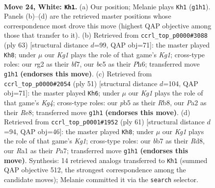 \documentclass[11pt]{article}
\begin{document}
\clearpage

\begin{figure}[p]\centering
\begin{subfigure}{0.46\textwidth}\centering
\resizebox{\linewidth}{!}{%
\newchessgame
\chessboard[
  setfen={1n2k3/1b6/8/ppb2p2/8/8/PN2PPr1/R2Q1RK1 w - - 0 24},
  showmover=false,
  pgfstyle=straightmove, color=movearrow, markmove={g1-h1}
]}
\caption{}
\end{subfigure}\hfill
\begin{subfigure}{0.46\textwidth}\centering
\resizebox{\linewidth}{!}{%
\newchessgame
\chessboard[
  setfen={1r1r2k1/5Bp1/3q3p/p7/8/7P/Q4PP1/2bR2K1 b - - 0 32},
  showmover=false,
  pgfstyle=straightmove, color=movearrow, markmove={g8-h8}
]}
\caption{}
\end{subfigure}
\\[4pt]
\begin{subfigure}{0.46\textwidth}\centering
\resizebox{\linewidth}{!}{%
\newchessgame
\chessboard[
  setfen={1r2r3/3B3p/p2p2p1/6k1/1R2n2P/5R2/P1P3P1/6K1 b - - 0 26},
  showmover=false,
  pgfstyle=straightmove, color=movearrow, markmove={g5-h6}
]}
\caption{}
\end{subfigure}\hfill
\begin{subfigure}{0.46\textwidth}\centering
\resizebox{\linewidth}{!}{%
\newchessgame
\chessboard[
  setfen={3r1rk1/p7/2p3Q1/4P3/1p3pp1/8/PPK1B1q1/R7 b - - 2 31},
  showmover=false,
  pgfstyle=straightmove, color=movearrow, markmove={g8-h8}
]}
\caption{}
\end{subfigure}
\caption{\textbf{Move 24, White: \texttt{Kh1}.} (a) Our position; Melanie plays \texttt{Kh1} (\texttt{g1h1}). Panels (b)--(d) are the retrieved master positions whose correspondence most drove this move (highest QAP objective among those that transfer to it). (b) Retrieved from \texttt{ccrl\_top\_p0000\#3088} (ply 63) [structural distance $d$=99, QAP obj=71]: the master played \texttt{Kh8}; under $\mu$ our \emph{Kg1} plays the role of that game's \emph{Kg1}; cross-type roles: our \emph{r}g2 as their \emph{b}f7, our \emph{b}c5 as their \emph{P}h6; transferred move \texttt{g1h1} \textbf{(endorses this move)}. (c) Retrieved from \texttt{ccrl\_top\_p0000\#2054} (ply 51) [structural distance $d$=104, QAP obj=71]: the master played \texttt{Kh6}; under $\mu$ our \emph{Kg1} plays the role of that game's \emph{Kg4}; cross-type roles: our \emph{p}b5 as their \emph{R}b8, our \emph{P}a2 as their \emph{R}e8; transferred move \texttt{g1h1} \textbf{(endorses this move)}. (d) Retrieved from \texttt{ccrl\_top\_p0001\#1952} (ply 61) [structural distance $d$=94, QAP obj=46]: the master played \texttt{Kh8}; under $\mu$ our \emph{Kg1} plays the role of that game's \emph{Kg1}; cross-type roles: our \emph{b}b7 as their \emph{R}d8, our \emph{R}a1 as their \emph{P}a7; transferred move \texttt{g1h1} \textbf{(endorses this move)}. Synthesis: 14 retrieved analogs transferred to \texttt{Kh1} (summed QAP objective 512, the strongest correspondence among the candidate moves); Melanie committed it via the \texttt{search} selector.}
\label{fig:thought-m46}
\end{figure}
\end{document}
